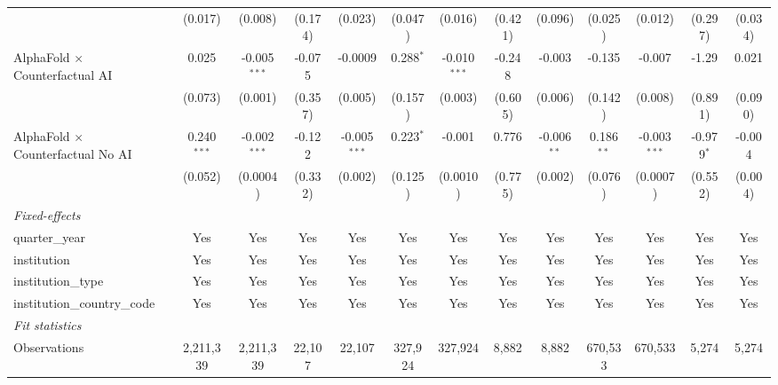 \begin{tabular}{lcccccccccccc}
                                            & (0.017)       & (0.008)        & (0.174)      & (0.023)        & (0.047)       & (0.016)        & (0.421) & (0.096)       & (0.025)       & (0.012)        & (0.297)      & (0.034)\\   
   AlphaFold $\times$ Counterfactual AI     & 0.025         & -0.005$^{***}$ & -0.075       & -0.0009        & 0.288$^{*}$   & -0.010$^{***}$ & -0.248  & -0.003        & -0.135        & -0.007         & -1.29        & 0.021\\   
                                            & (0.073)       & (0.001)        & (0.357)      & (0.005)        & (0.157)       & (0.003)        & (0.605) & (0.006)       & (0.142)       & (0.008)        & (0.891)      & (0.090)\\   
   AlphaFold $\times$ Counterfactual No AI  & 0.240$^{***}$ & -0.002$^{***}$ & -0.122       & -0.005$^{***}$ & 0.223$^{*}$   & -0.001         & 0.776   & -0.006$^{**}$ & 0.186$^{**}$  & -0.003$^{***}$ & -0.979$^{*}$ & -0.004\\   
                                            & (0.052)       & (0.0004)       & (0.332)      & (0.002)        & (0.125)       & (0.0010)       & (0.775) & (0.002)       & (0.076)       & (0.0007)       & (0.552)      & (0.004)\\   
   \midrule
   \emph{Fixed-effects}\\
   quarter\_year                            & Yes           & Yes            & Yes          & Yes            & Yes           & Yes            & Yes     & Yes           & Yes           & Yes            & Yes          & Yes\\  
   institution                              & Yes           & Yes            & Yes          & Yes            & Yes           & Yes            & Yes     & Yes           & Yes           & Yes            & Yes          & Yes\\  
   institution\_type                        & Yes           & Yes            & Yes          & Yes            & Yes           & Yes            & Yes     & Yes           & Yes           & Yes            & Yes          & Yes\\  
   institution\_country\_code               & Yes           & Yes            & Yes          & Yes            & Yes           & Yes            & Yes     & Yes           & Yes           & Yes            & Yes          & Yes\\  
   \midrule
   \emph{Fit statistics}\\
   Observations                             & 2,211,339     & 2,211,339      & 22,107       & 22,107         & 327,924       & 327,924        & 8,882   & 8,882         & 670,533       & 670,533        & 5,274        & 5,274\\  

\end{tabular}
